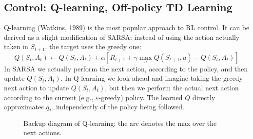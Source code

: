 \subsection{Control: Q-learning, Off-policy TD Learning}
Q-learning (Watkins, 1989) is the most popular approach to RL control. It can be derived as a slight modification of SARSA: instead of using the action actually taken in $S_{t+1}$, the target uses the greedy one:
\[Q(S_t,A_t)\leftarrow Q(S_t,A_t)+\alpha\left[R_{t+1}+\gamma \max_{a}Q(S_{t+1},a)-Q(S_t,A_t)\right]\]
In SARSA we actually perform the next action, according to the policy, and then update $Q(S_t,A_t)$. In Q-learning we look ahead and imagine taking the greedy next action to update $Q(S_t,A_t)$, but then we perform the actual next action according to the current (e.g., $\varepsilon$-greedy) policy. The learned $Q$ directly approximates $q_*$, independently of the policy being followed.

\begin{figure}[htbp]
\centering
{}
\caption{Backup diagram of Q-learning: the arc denotes the max over the next actions.}
\label{fig:backup-qlearning}
\end{figure}

